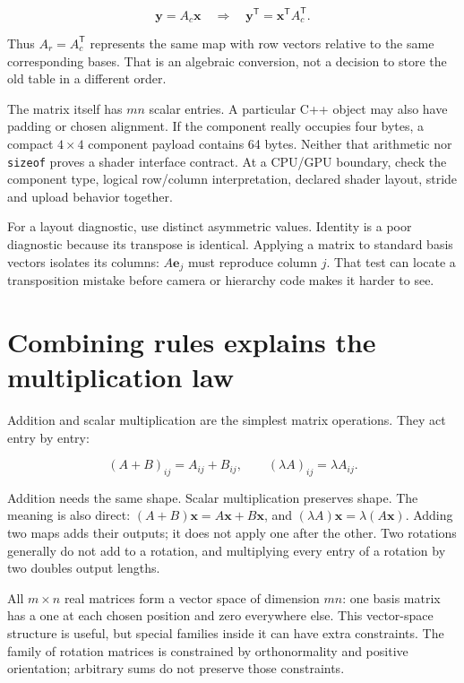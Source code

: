 \[
\mathbf y=A_c\mathbf x
\quad\Longrightarrow\quad
\mathbf y^{\mathsf T}=\mathbf x^{\mathsf T}A_c^{\mathsf T}.
\]

Thus \(A_r=A_c^{\mathsf T}\) represents the same map with row vectors relative to the same corresponding bases. That is an algebraic conversion, not a decision to store the old table in a different order.

The matrix itself has \(mn\) scalar entries. A particular C++ object may also have padding or chosen alignment. If the component really occupies four bytes, a compact \(4\times4\) component payload contains 64 bytes. Neither that arithmetic nor \texttt{sizeof} proves a shader interface contract. At a CPU/GPU boundary, check the component type, logical row/column interpretation, declared shader layout, stride and upload behavior together.

For a layout diagnostic, use distinct asymmetric values. Identity is a poor diagnostic because its transpose is identical. Applying a matrix to standard basis vectors isolates its columns: \(A\mathbf e_j\) must reproduce column \(j\). That test can locate a transposition mistake before camera or hierarchy code makes it harder to see.

\section{Combining rules explains the multiplication law}\label{01-foundations-i-ch018-combining-rules-explains-the-multiplication-law}

Addition and scalar multiplication are the simplest matrix operations. They act entry by entry:

\[
(A+B)_{ij}=A_{ij}+B_{ij},\qquad
(\lambda A)_{ij}=\lambda A_{ij}.
\]

Addition needs the same shape. Scalar multiplication preserves shape. The meaning is also direct: \((A+B)\mathbf x=A\mathbf x+B\mathbf x\), and \((\lambda A)\mathbf x=\lambda(A\mathbf x)\). Adding two maps adds their outputs; it does not apply one after the other. Two rotations generally do not add to a rotation, and multiplying every entry of a rotation by two doubles output lengths.

All \(m\times n\) real matrices form a vector space of dimension \(mn\): one basis matrix has a one at each chosen position and zero everywhere else. This vector-space structure is useful, but special families inside it can have extra constraints. The family of rotation matrices is constrained by orthonormality and positive orientation; arbitrary sums do not preserve those constraints.

